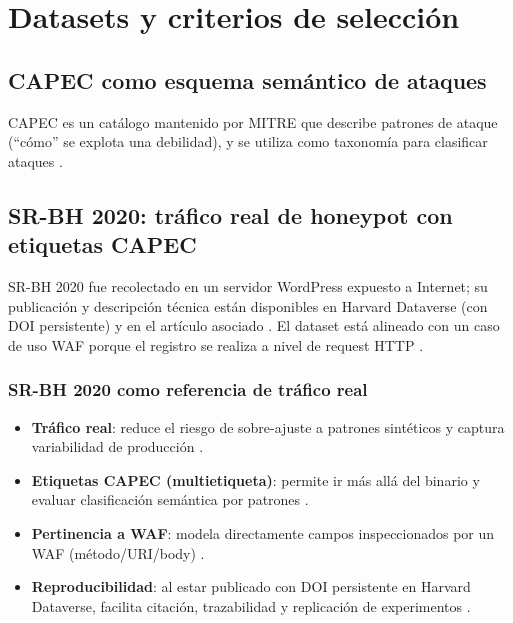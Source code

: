 \documentclass[12pt,oneside]{report}
\begin{document}
\chapter{Datasets y criterios de selección}

\section{CAPEC como esquema semántico de ataques}
CAPEC es un catálogo mantenido por MITRE que describe patrones de ataque (``cómo'' se explota una debilidad),
y se utiliza como taxonomía para clasificar ataques \cite{capec_home,capec_about}.

\section{SR-BH 2020: tráfico real de honeypot con etiquetas CAPEC}
SR-BH 2020 fue recolectado en un servidor WordPress expuesto a Internet; su publicación y descripción técnica están disponibles
en Harvard Dataverse (con DOI persistente) y en el artículo asociado \cite{srbh_dataverse,srbh_paper}. El dataset está alineado con un caso de uso WAF
porque el registro se realiza a nivel de request HTTP \cite{owasp_waf,modsecurity_site}.

\subsection{SR-BH 2020 como referencia de tráfico real}
\begin{itemize}[leftmargin=*]
  \item \textbf{Tráfico real}: reduce el riesgo de sobre-ajuste a patrones sintéticos y captura variabilidad de producción \cite{srbh_paper}.
  \item \textbf{Etiquetas CAPEC (multietiqueta)}: permite ir más allá del binario y evaluar clasificación semántica por patrones \cite{srbh_paper,capec_about}.
  \item \textbf{Pertinencia a WAF}: modela directamente campos inspeccionados por un WAF (método/URI/body) \cite{owasp_waf,modsecurity_site}.
  \item \textbf{Reproducibilidad}: al estar publicado con DOI persistente en Harvard Dataverse, facilita citación, trazabilidad y replicación de experimentos \cite{srbh_dataverse}.
\end{itemize}
\end{document}
